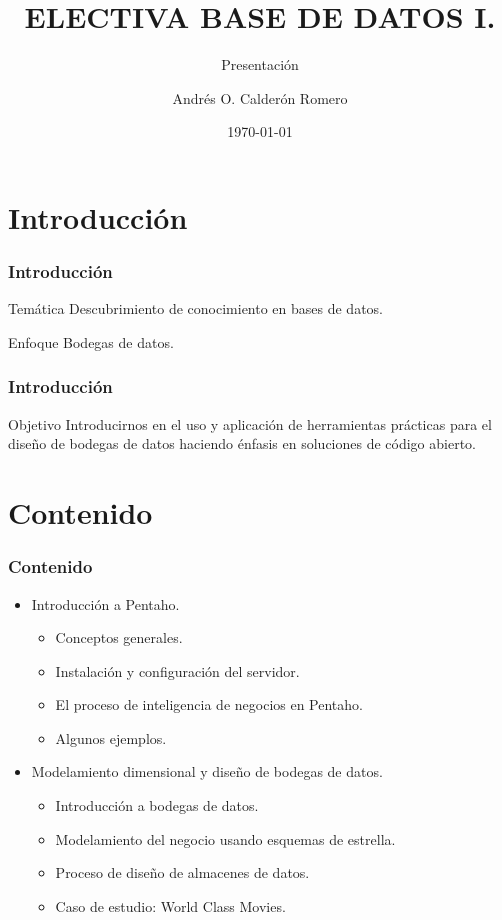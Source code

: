 \documentclass{beamer}
\begin{document}
\title[Electiva Base de Datos I]{ELECTIVA BASE DE DATOS I.}
\subtitle[Presentación]{Presentación}
\author[M.Sc. Andrés Calderón]{Andrés O. Calderón Romero}
\date[\today]{\today}

\begin{frame}
  \titlepage
\end{frame}


\section{Introducción}
\begin{frame}\frametitle{Introducción}
  \begin{block}{Temática}
    Descubrimiento de conocimiento en bases de datos.
  \end{block}
  \begin{block}{Enfoque}
    Bodegas de datos.
  \end{block}
\end{frame}

\begin{frame}\frametitle{Introducción}
  \begin{block}{Objetivo}
    Introducirnos en el uso y aplicación de herramientas prácticas para el diseño de bodegas de datos haciendo énfasis en soluciones de código abierto.
  \end{block}
\end{frame}

\section{Contenido}
\begin{frame}\frametitle{Contenido}
  \begin{itemize}
    \item Introducción a Pentaho.
      \begin{itemize}
	\item Conceptos generales.
	\item Instalación y configuración del servidor.
	\item El proceso de inteligencia de negocios en Pentaho.
	\item Algunos ejemplos.
      \end{itemize}
    \item Modelamiento dimensional y diseño de bodegas de datos.
      \begin{itemize}
	\item Introducción a bodegas de datos.
	\item Modelamiento del negocio usando esquemas de estrella.
	\item Proceso de diseño de almacenes de datos.
	\item Caso de estudio: World Class Movies.
      \end{itemize}
  \end{itemize}
\end{frame}
\end{document}
